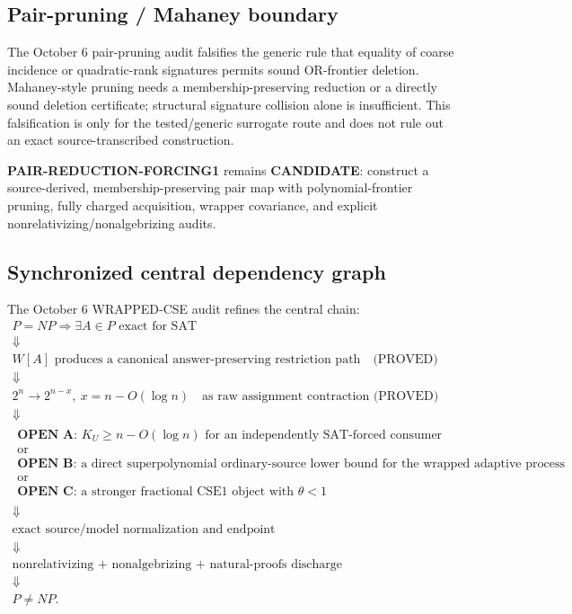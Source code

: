 \documentclass[11pt]{article}
\newcommand{\statuscandidate}{\textcolor{candidate}{\textbf{CANDIDATE}}}
\theoremstyle{plain}
\theoremstyle{definition}
\theoremstyle{remark}
\begin{document}
\subsection{Pair-pruning / Mahaney boundary}

The October 6 pair-pruning audit falsifies the generic rule that equality of
coarse incidence or quadratic-rank signatures permits sound OR-frontier
deletion. Mahaney-style pruning needs a membership-preserving reduction or a
directly sound deletion certificate; structural signature collision alone is
insufficient. This falsification is only for the tested/generic surrogate
route and does not rule out an exact source-transcribed construction.

\textbf{PAIR-REDUCTION-FORCING1} remains \statuscandidate: construct a
source-derived, membership-preserving pair map with polynomial-frontier
pruning, fully charged acquisition, wrapper covariance, and explicit
nonrelativizing/nonalgebrizing audits.

\subsection{Synchronized central dependency graph}

The October 6 WRAPPED-CSE audit refines the central chain:
\[
\boxed{
\begin{array}{c}
P=NP
\Rightarrow
\exists A\in P\text{ exact for SAT}\\
\Downarrow\\
W[A]\text{ produces a canonical answer-preserving restriction path}
\quad\text{(PROVED)}\\
\Downarrow\\
2^n\to2^{n-x},\ x=n-O(\log n)
\quad\text{as raw assignment contraction (PROVED)}\\
\Downarrow\\
\begin{array}{c}
\textbf{OPEN A: }K_U\ge n-O(\log n)
\text{ for an independently SAT-forced consumer}\\
\text{or}\\
\textbf{OPEN B: }\text{a direct superpolynomial ordinary-source lower bound}
\text{ for the wrapped adaptive process}\\
\text{or}\\
\textbf{OPEN C: }\text{a stronger fractional CSE1 object with }\theta<1
\end{array}\\
\Downarrow\\
\text{exact source/model normalization and endpoint}\\
\Downarrow\\
\text{nonrelativizing + nonalgebrizing + natural-proofs discharge}\\
\Downarrow\\
P\ne NP.
\end{array}}
\]
\end{document}
